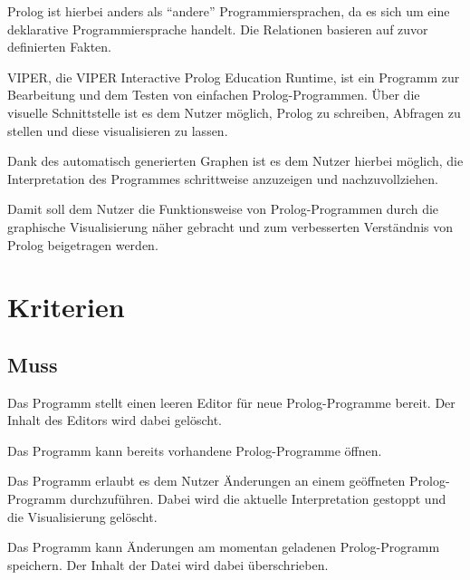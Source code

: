 \documentclass[parskip=full,11pt,twoside]{scrartcl}
\begin{document}
Prolog ist hierbei anders als \enquote{andere} Programmiersprachen, da es sich um eine deklarative Programmiersprache handelt. Die Relationen basieren auf zuvor definierten Fakten.

VIPER, die VIPER Interactive Prolog Education Runtime, ist ein Programm zur Bearbeitung und dem Testen von einfachen Prolog-Programmen. Über die visuelle Schnittstelle ist es dem Nutzer möglich, Prolog zu schreiben, Abfragen zu stellen und diese visualisieren zu lassen.

Dank des automatisch generierten Graphen ist es dem Nutzer hierbei möglich, die Interpretation des Programmes schrittweise anzuzeigen und nachzuvollziehen.

Damit soll dem Nutzer die Funktionsweise von Prolog-Programmen durch die graphische Visualisierung näher gebracht und zum verbesserten Verständnis von Prolog beigetragen werden.

\pagebreak
\section{Kriterien}

\subsection{Muss}


Das Programm stellt einen leeren Editor für neue Prolog-Programme bereit. Der Inhalt des Editors wird dabei gelöscht.


Das Programm kann bereits vorhandene Prolog-Programme öffnen.


Das Programm erlaubt es dem Nutzer Änderungen an einem geöffneten Prolog-Programm durchzuführen. Dabei wird die aktuelle Interpretation gestoppt und die Visualisierung gelöscht.


Das Programm kann Änderungen am momentan geladenen Prolog-Programm speichern. Der Inhalt der Datei wird dabei überschrieben.

\end{document}
